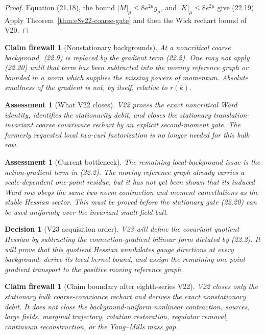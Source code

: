 \documentclass[11pt,oneside]{book}
\newtheorem{assessment}[theorem]{Assessment}
\newtheorem{firewall}[theorem]{Claim firewall}
\newtheorem{decision}[theorem]{Decision}
\theoremstyle{definition}
\theoremstyle{remark}
\begin{document}
\begin{proof}
Equation (21.18), the bound
\(|M|_\mu\leq8e^{2\mu}g_\mu\), and
\(|K|_\mu\leq8e^{2\mu}\) give (22.19).
Apply Theorem~\ref{thm:e8v22-coarse-gate} and then the Wick rechart
bound of V20.
\end{proof}

\begin{firewall}[Nonstationary backgrounds]
\label{fire:e8v22-nonstationary}
At a noncritical coarse background, (22.9) is replaced by the
gradient term (22.2).  One may not apply (22.20) until that term has
been subtracted into the moving reference graph or bounded in a norm
which supplies the missing powers of momentum.  Absolute smallness of
the gradient is not, by itself, relative to \(r(k)\).
\end{firewall}

\begin{assessment}[What V22 closes]
\label{ass:e8v22-closes}
V22 proves the exact noncritical Ward identity, identifies the
stationarity debit, and closes the stationary translation-invariant
coarse covariance rechart by an explicit second-moment gate.  The
formerly requested local two-curl factorization is no longer needed
for this bulk row.
\end{assessment}

\begin{assessment}[Current bottleneck]
\label{ass:e8v22-remains}
The remaining local-background issue is the action-gradient term in
(22.2).  The moving reference graph already carries a scale-dependent
one-point residue, but it has not yet been shown that its induced Ward
row obeys the same two-norm contraction and moment cancellations as
the stable Hessian sector.  This must be proved before the stationary
gate (22.20) can be used uniformly over the invariant small-field
ball.
\end{assessment}

\begin{decision}[V23 acquisition order]
\label{dec:e8v22-v23}
V23 will define the covariant quotient Hessian by subtracting the
connection-gradient bilinear form dictated by (22.2).  It will prove
that this quotient Hessian annihilates gauge directions at every
background, derive its local kernel bound, and assign the remaining
one-point gradient transport to the positive moving reference graph.
\end{decision}

\begin{firewall}[Claim boundary after eighth-series V22]
\label{fire:e8v22-claim}
V22 closes only the stationary bulk coarse-covariance rechart and
derives the exact nonstationary debit.  It does not close the
background-uniform nonlinear contraction, sources, large fields,
marginal trajectory, rotation restoration, regulator removal,
continuum reconstruction, or the Yang--Mills mass gap.
\end{firewall}
\end{document}
